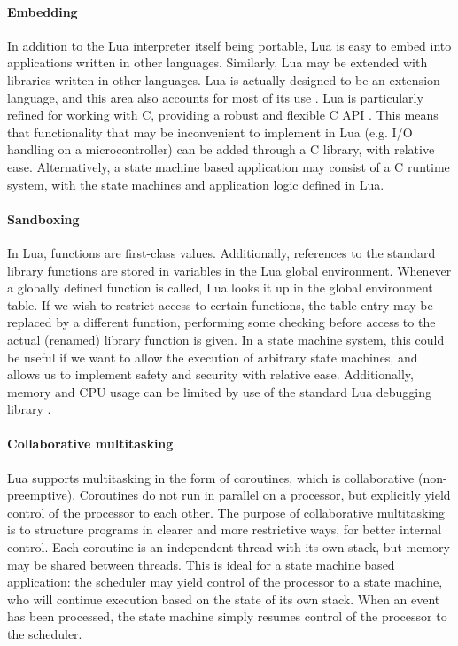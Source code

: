 \paragraph{Embedding}
In addition to the Lua interpreter itself being portable, Lua is easy to embed into applications written in other languages. Similarly, Lua may be extended with libraries written in other languages. Lua is actually designed to be an extension language, and this area also accounts for most of its use \cite{website:where_lua_is_used}. Lua is particularly refined for working with C, providing a robust and flexible C API \cite[ch. 24]{book:programming_in_lua_first}. This means that functionality that may be inconvenient to implement in Lua (e.g. I/O handling on a microcontroller) can be added through a C library, with relative ease. Alternatively, a state machine based application may consist of a C runtime system, with the state machines and application logic defined in Lua.

\paragraph{Sandboxing}
In Lua, functions are first-class values. Additionally, references to the standard library functions are stored in variables in the Lua global environment. Whenever a globally defined function is called, Lua looks it up in the global environment table. If we wish to restrict access to certain functions, the table entry may be replaced by a different function, performing some checking before access to the actual (renamed) library function is given. In a state machine system, this could be useful if we want to allow the execution of arbitrary state machines, and allows us to implement safety and security with relative ease. Additionally, memory and CPU usage can be limited by use of the standard Lua debugging library \cite{book:lua_reference_manual}.

\paragraph{Collaborative multitasking}
Lua supports multitasking in the form of coroutines, which is collaborative (non-preemptive). Coroutines do not run in parallel on a processor, but explicitly yield control of the processor to each other. The purpose of collaborative multitasking is to structure programs in clearer and more restrictive ways, for better internal control. Each coroutine is an independent thread with its own stack, but memory may be shared between threads. This is ideal for a state machine based application: the scheduler may yield control of the processor to a state machine, who will continue execution based on the state of its own stack. When an event has been processed, the state machine simply resumes control of the processor to the scheduler.

